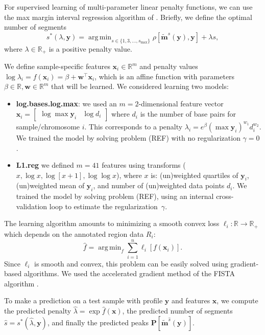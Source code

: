 \documentclass{article}
\DeclareMathOperator*{\argmin}{arg\,min}
\newcommand{\RR}{\mathbb R}
\begin{document}
For supervised learning of multi-parameter linear penalty functions,
we can use the max margin interval regression algorithm of
\citet{HOCKING-penalties}. Briefly, we define the optimal number of
segments
\begin{equation}
  s^*(\lambda, \mathbf y) = 
  \argmin_{s\in\{1,3,\dots, s_{\text{max}}\}}
  \rho\left[
    \mathbf{\tilde m}^s(\mathbf y),
    \mathbf y
  \right]
  + \lambda s,
\end{equation}
where $\lambda\in\RR_+$ is a positive
penalty value. 

We define sample-specific features $\mathbf x_i\in\RR^m$ and penalty
values $\log \lambda_i = f(\mathbf x_i) = \beta + \mathbf w^\intercal
\mathbf x_i$, which is an affine function with parameters
$\beta\in\RR,\mathbf w\in\RR^m$ that will be learned. We considered
learning two models:

\begin{itemize}
\item \textbf{log.bases.log.max}: we used an $m=2$-dimensional feature
  vector $\mathbf x_i = \left[\begin{array}{cc} \log\max \mathbf y_i &
      \log d_i
\end{array}\right]$ where $d_i$ is the number of base pairs for 
sample/chromosome $i$.  This corresponds to a penalty $\lambda_i =
e^\beta (\max\mathbf y_i)^{w_1} d_i^{w_2}$. We trained the
model by solving problem (REF) with no regularization $\gamma=0$.
\item \textbf{L1.reg} we defined $m=41$ features using transforms ($x,
  \log x, \log[x+1], \log\log x$), where $x$ is: (un)weighted
  quartiles of $\mathbf y_i$, (un)weighted mean of $\mathbf y_i$, and
  number of (un)weighted data points $d_i$. We trained the model by solving
  problem (REF), using an internal cross-validation loop to estimate
  the regularization~$\gamma$.
\end{itemize}
The learning algorithm amounts to minimizing a
smooth convex loss $\ell_i:\RR\rightarrow\RR_+$ which depends on the
annotated region data $R_i$:
\begin{equation}
  \label{eq:relax}
  \hat f = \argmin_f \sum_{i=1}^n
  \ell_i\left[ f(\mathbf x_i) \right].
\end{equation}
Since $\ell_i$ is smooth and convex, this problem can be easily solved
using gradient-based algorithms. We used the accelerated gradient
method of the FISTA algorithm \citep{fista}.

To make a prediction on a
test sample with profile $\mathbf y$ and features $\mathbf x$, we
compute the predicted penalty $\hat \lambda = \exp \hat f(\mathbf x)$,
the predicted number of segments $\hat s = s^*(\hat \lambda, \mathbf
y)$, and finally the predicted peaks $\mathbf P\left[ \mathbf{\tilde
    m}^{\hat s}(\mathbf y) \right]$.
\end{document}
